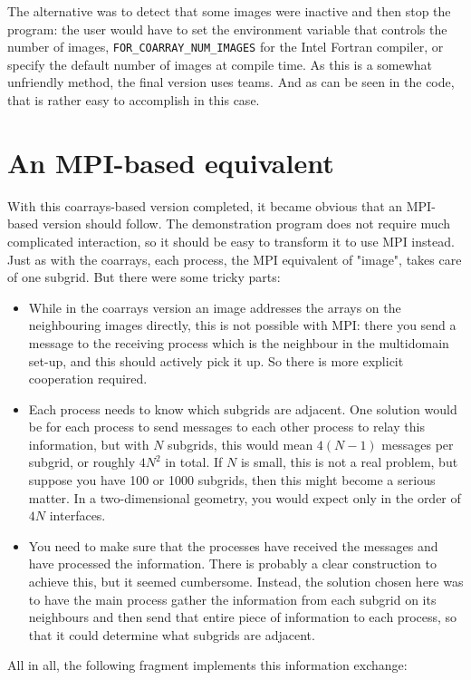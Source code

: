 \documentclass[onecolumn]{article}
\begin{document}
The alternative was to detect that some images were inactive and then stop the program: the user would have to set the environment variable
that controls the number of images, \verb+FOR_COARRAY_NUM_IMAGES+ for the Intel Fortran compiler, or specify the default number of images at
compile time. As this is a somewhat unfriendly method, the final version uses teams. And as can be seen in the code, that is rather easy
to accomplish in this case.


\section{An MPI-based equivalent}
With this coarrays-based version completed, it became obvious that an MPI-based version should follow. The demonstration program
does not require much complicated interaction, so it should be easy to transform it to use MPI instead. Just as with the
coarrays, each process, the MPI equivalent of "image", takes care of one subgrid. But there were some tricky parts:

\begin{itemize}
\item
While in the coarrays version an image addresses the arrays on the neighbouring images directly, this is not possible with MPI: there you
send a message to the receiving process which is the neighbour in the multidomain set-up,
and this should actively pick it up. So there is more explicit cooperation required.
\item
Each process needs to know which subgrids are adjacent. One solution would be for each process to send messages to each
other process to relay this information, but with $N$ subgrids, this would mean $4(N-1)$ messages per subgrid, or roughly $4N^2$ in total.
If $N$ is small, this is not a real problem, but suppose you have 100 or 1000 subgrids, then this might become a serious matter.
In a two-dimensional geometry, you would expect only in the order of $4N$ interfaces.
\item
You need to make sure that the processes have received the messages and have processed the information. There is probably
a clear construction to achieve this, but it seemed cumbersome. Instead, the solution chosen here was to have the main process
gather the information from each subgrid on its neighbours and then send that
entire piece of information to each process, so that it could determine what subgrids are adjacent.
\end{itemize}

All in all, the following fragment implements this information exchange:
\end{document}
